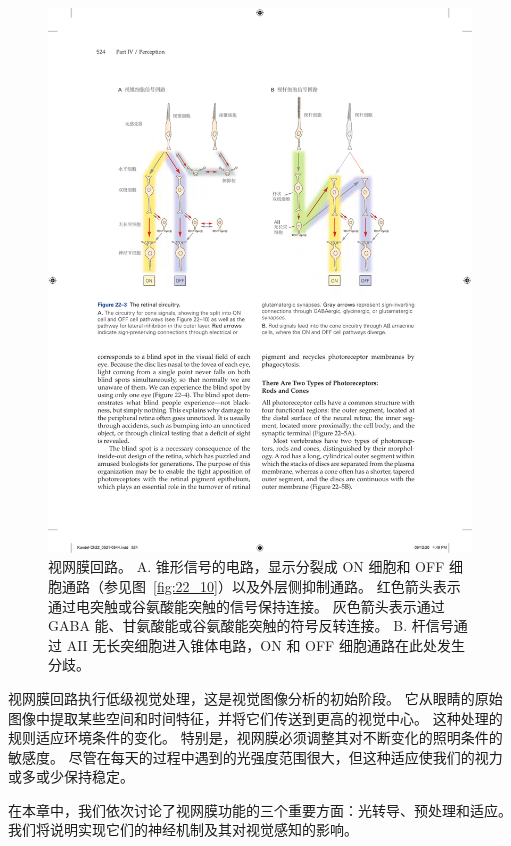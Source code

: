 \begin{figure}[htbp]
	\centering
	\includegraphics[width=1.0\linewidth]{chap22/fig_22_3}
	\caption{视网膜回路。
		A. 锥形信号的电路，显示分裂成 ON 细胞和 OFF 细胞通路（参见图~\ref{fig:22_10}）以及外层侧抑制通路。
		红色箭头表示通过电突触或谷氨酸能突触的信号保持连接。
		灰色箭头表示通过 GABA 能、甘氨酸能或谷氨酸能突触的符号反转连接。
		B. 杆信号通过 AII 无长突细胞进入锥体电路，ON 和 OFF 细胞通路在此处发生分歧。}
	\label{fig:22_3}
\end{figure}


视网膜回路执行低级视觉处理，这是视觉图像分析的初始阶段。
它从眼睛的原始图像中提取某些空间和时间特征，并将它们传送到更高的视觉中心。
这种处理的规则适应环境条件的变化。
特别是，视网膜必须调整其对不断变化的照明条件的敏感度。
尽管在每天的过程中遇到的光强度范围很大，但这种适应使我们的视力或多或少保持稳定。


在本章中，我们依次讨论了视网膜功能的三个重要方面：光转导、预处理和适应。
我们将说明实现它们的神经机制及其对视觉感知的影响。



